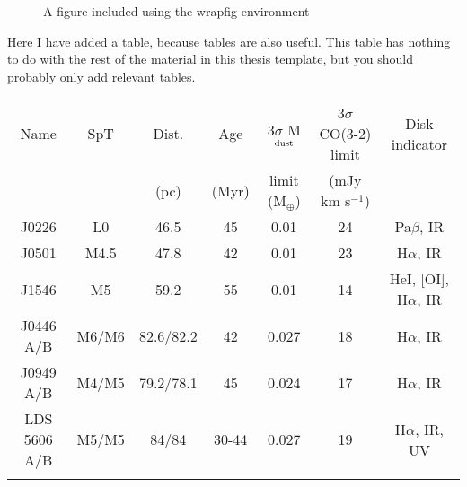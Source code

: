 \begin{wrapfigure}[11]{r}{0.45\textwidth}
\centering
\vspace{-.1\baselineskip}
\caption[Another short-form caption]{A figure included using the wrapfig environment}
\label{fig:anotherFigure}
\end{wrapfigure}

Here I have added a table, because tables are also useful. This table has nothing to do with the rest of the material in this thesis template, but you should probably only add relevant tables.
\begin{table}[tbh]
\begin{center}
\begin{tabular}{ccccccc}
\hline \noalign {\smallskip}
Name & SpT & Dist. & Age & 3$\sigma$ M$_{\rm dust}$ & 3$\sigma$ CO(3-2) limit & Disk indicator \\
 & & (pc) & (Myr) & limit (M$_{\oplus}$) &  (mJy km s$^{-1}$)\\
\hline \noalign {\smallskip}
J0226 & L0 & 46.5 & 45 & 0.01 & 24 & Pa$\beta$, IR\\
J0501 & M4.5 & 47.8 & 42 & 0.01 & 23 & H$\alpha$, IR\\
J1546 & M5 & 59.2 & 55 & 0.01 & 14 & HeI, [OI], H$\alpha$, IR\\
J0446 A/B & M6/M6 & 82.6/82.2 & 42 &  0.027 & 18 & H$\alpha$, IR\\
J0949 A/B & M4/M5 & 79.2/78.1 & 45 &  0.024 & 17 & H$\alpha$, IR\\
LDS 5606 A/B & M5/M5 & 84/84 & 30-44 & 0.027 & 19 & H$\alpha$, IR, UV\\
\hline \noalign {\smallskip}
\end{tabular}
\end{center}
\end{table}


